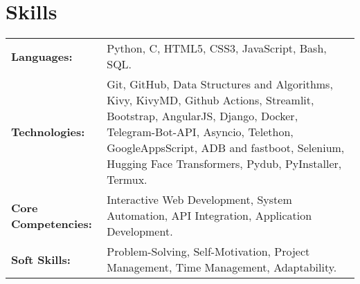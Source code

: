 \documentclass[a4paper,10pt]{article}
\begin{document}
\section{Skills}
\begin{tabularx}{\linewidth}{@{} l X @{}}
    \textbf{Languages:} & Python, C, HTML5, CSS3, JavaScript, Bash, SQL. \\
    \textbf{Technologies:} & Git, GitHub, Data Structures and Algorithms, Kivy, KivyMD, Github Actions, Streamlit, Bootstrap, AngularJS, Django, Docker, Telegram-Bot-API, Asyncio, Telethon, GoogleAppsScript, ADB and fastboot, Selenium, Hugging Face Transformers, Pydub, PyInstaller, Termux.  \\
    \textbf{Core Competencies:} & Interactive Web Development, System Automation, API Integration, Application Development. \\
    \textbf{Soft Skills:} & Problem-Solving, Self-Motivation, Project Management, Time Management, Adaptability.  \\
\end{tabularx}

\vspace{11pt}


\newcommand{\projectentry}[5]{%
    \noindent\vspace{1pt}
    \textcolor{myblue}{\textbf{\href{#2}{#1}}} \textcolor{mydarkblue}{\href{#3}{\faLink}} \\ \vspace{-10pt}
    \begin{itemize}[left=0pt, label=--, nosep]
        \item \vspace{-10pt}\textbf{Overview:} #4
    \end{itemize}
    \vspace{-13pt}%
}


\vspace{-13pt}
\end{document}
